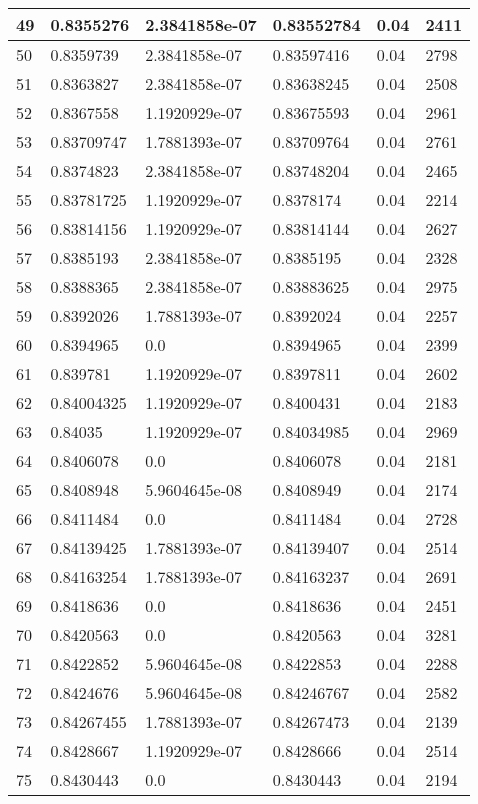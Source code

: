 \begin{longtable}{|l|l|l|l|l|l|}
49 & 0.8355276 & 2.3841858e-07 & 0.83552784 & 0.04 & 2411 \\ \hline 
50 & 0.8359739 & 2.3841858e-07 & 0.83597416 & 0.04 & 2798 \\ \hline 
51 & 0.8363827 & 2.3841858e-07 & 0.83638245 & 0.04 & 2508 \\ \hline 
52 & 0.8367558 & 1.1920929e-07 & 0.83675593 & 0.04 & 2961 \\ \hline 
53 & 0.83709747 & 1.7881393e-07 & 0.83709764 & 0.04 & 2761 \\ \hline 
54 & 0.8374823 & 2.3841858e-07 & 0.83748204 & 0.04 & 2465 \\ \hline 
55 & 0.83781725 & 1.1920929e-07 & 0.8378174 & 0.04 & 2214 \\ \hline 
56 & 0.83814156 & 1.1920929e-07 & 0.83814144 & 0.04 & 2627 \\ \hline 
57 & 0.8385193 & 2.3841858e-07 & 0.8385195 & 0.04 & 2328 \\ \hline 
58 & 0.8388365 & 2.3841858e-07 & 0.83883625 & 0.04 & 2975 \\ \hline 
59 & 0.8392026 & 1.7881393e-07 & 0.8392024 & 0.04 & 2257 \\ \hline 
60 & 0.8394965 & 0.0 & 0.8394965 & 0.04 & 2399 \\ \hline 
61 & 0.839781 & 1.1920929e-07 & 0.8397811 & 0.04 & 2602 \\ \hline 
62 & 0.84004325 & 1.1920929e-07 & 0.8400431 & 0.04 & 2183 \\ \hline 
63 & 0.84035 & 1.1920929e-07 & 0.84034985 & 0.04 & 2969 \\ \hline 
64 & 0.8406078 & 0.0 & 0.8406078 & 0.04 & 2181 \\ \hline 
65 & 0.8408948 & 5.9604645e-08 & 0.8408949 & 0.04 & 2174 \\ \hline 
66 & 0.8411484 & 0.0 & 0.8411484 & 0.04 & 2728 \\ \hline 
67 & 0.84139425 & 1.7881393e-07 & 0.84139407 & 0.04 & 2514 \\ \hline 
68 & 0.84163254 & 1.7881393e-07 & 0.84163237 & 0.04 & 2691 \\ \hline 
69 & 0.8418636 & 0.0 & 0.8418636 & 0.04 & 2451 \\ \hline 
70 & 0.8420563 & 0.0 & 0.8420563 & 0.04 & 3281 \\ \hline 
71 & 0.8422852 & 5.9604645e-08 & 0.8422853 & 0.04 & 2288 \\ \hline 
72 & 0.8424676 & 5.9604645e-08 & 0.84246767 & 0.04 & 2582 \\ \hline 
73 & 0.84267455 & 1.7881393e-07 & 0.84267473 & 0.04 & 2139 \\ \hline 
74 & 0.8428667 & 1.1920929e-07 & 0.8428666 & 0.04 & 2514 \\ \hline 
75 & 0.8430443 & 0.0 & 0.8430443 & 0.04 & 2194 \\ \hline 
\end{longtable}